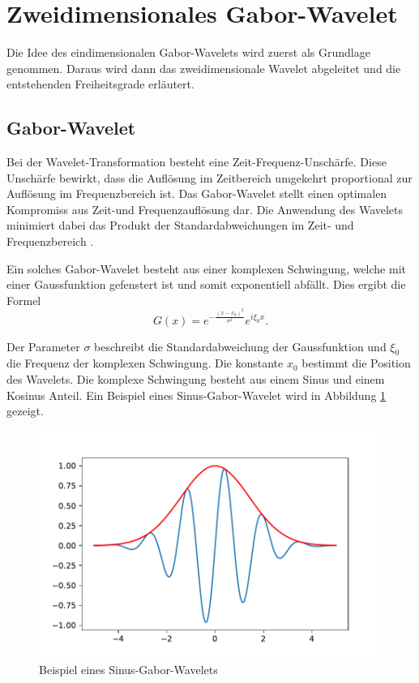 \section{Zweidimensionales Gabor-Wavelet}

Die Idee des eindimensionalen Gabor-Wavelets wird zuerst als Grundlage genommen. 
Daraus wird dann das zweidimensionale Wavelet abgeleitet und die entstehenden Freiheitsgrade erläutert.

\subsection{Gabor-Wavelet}

Bei der Wavelet-Transformation besteht eine Zeit-Frequenz-Unschärfe.
Diese Unschärfe bewirkt, dass die Auflösung im Zeitbereich umgekehrt proportional zur Auflösung im Frequenzbereich ist.
Das Gabor-Wavelet stellt einen optimalen Kompromiss aus Zeit-und Frequenzauflösung dar.
Die Anwendung des Wavelets minimiert dabei das Produkt der Standardabweichungen im Zeit- und Frequenzbereich \cite{paper:communication}.

Ein solches Gabor-Wavelet besteht aus einer komplexen Schwingung, welche mit einer Gaussfunktion gefenstert ist und somit exponentiell abfällt.
Dies ergibt die Formel
\begin{equation}\label{eq:1d_gabor}
G(x)= e^{-\frac{(x-x_{0})^{2}}{\sigma^{2}}} e^{i\xi_{0}x}.
\end{equation}

Der Parameter $\sigma$ beschreibt die Standardabweichung der Gaussfunktion und $\xi_{0}$ die Frequenz der komplexen Schwingung. 
Die konstante $x_0$ bestimmt die Position des Wavelets.
Die komplexe Schwingung besteht aus einem Sinus und einem  Kosinus Anteil. 
Ein Beispiel eines Sinus-Gabor-Wavelet wird in Abbildung \ref{fig:gabor1d} gezeigt.

\begin{figure}
	\centering
	\includegraphics[width=0.7\linewidth]{./papers/visuell/images/gabor_1d}
	\caption{Beispiel eines Sinus-Gabor-Wavelets}
	\label{fig:gabor1d}
\end{figure}


